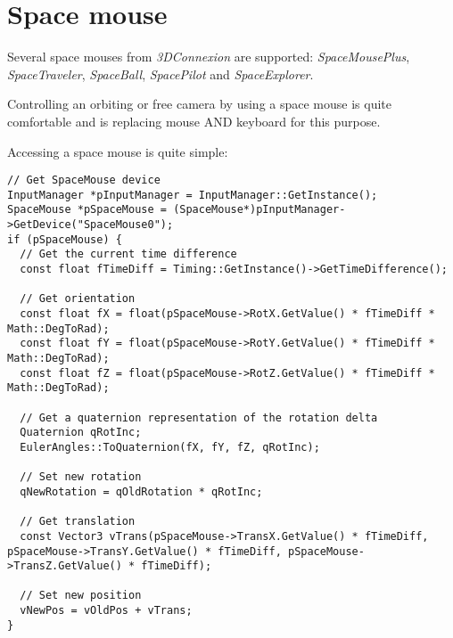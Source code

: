 \chapter{Space mouse}
Several space mouses from \emph{3DConnexion} are supported: \emph{SpaceMousePlus}, \emph{SpaceTraveler}, \emph{SpaceBall}, \emph{SpacePilot} and \emph{SpaceExplorer}.

Controlling an orbiting or free camera by using a space mouse is quite comfortable and is replacing mouse AND keyboard for this purpose.

Accessing a space mouse is quite simple:

\begin{lstlisting}[caption=Space mouse usage example]
// Get SpaceMouse device
InputManager *pInputManager = InputManager::GetInstance();
SpaceMouse *pSpaceMouse = (SpaceMouse*)pInputManager->GetDevice("SpaceMouse0");
if (pSpaceMouse) {
  // Get the current time difference
  const float fTimeDiff = Timing::GetInstance()->GetTimeDifference();

  // Get orientation
  const float fX = float(pSpaceMouse->RotX.GetValue() * fTimeDiff * Math::DegToRad);
  const float fY = float(pSpaceMouse->RotY.GetValue() * fTimeDiff * Math::DegToRad);
  const float fZ = float(pSpaceMouse->RotZ.GetValue() * fTimeDiff * Math::DegToRad);

  // Get a quaternion representation of the rotation delta
  Quaternion qRotInc;
  EulerAngles::ToQuaternion(fX, fY, fZ, qRotInc);

  // Set new rotation
  qNewRotation = qOldRotation * qRotInc;

  // Get translation
  const Vector3 vTrans(pSpaceMouse->TransX.GetValue() * fTimeDiff, pSpaceMouse->TransY.GetValue() * fTimeDiff, pSpaceMouse->TransZ.GetValue() * fTimeDiff);

  // Set new position
  vNewPos = vOldPos + vTrans;
}
\end{lstlisting}
